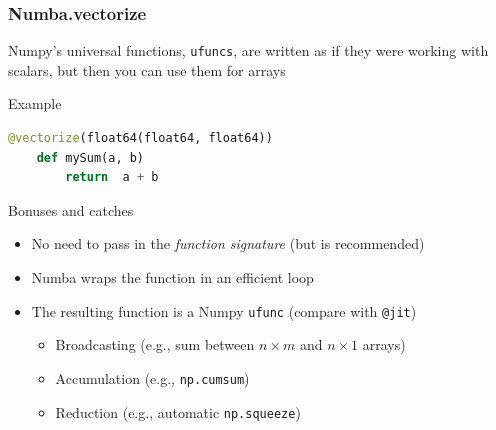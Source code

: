 \documentclass[10pt, aspectratio=1610]{beamer}
\begin{document}
\begin{frame}[fragile]
  \frametitle{Numba.vectorize}

  Numpy's universal functions, \texttt{ufuncs}, are written as if they were working with scalars, but then you can use them for arrays

  \vfill

  Example
  \begin{lstlisting}[language=python]
    @vectorize(float64(float64, float64))
    def mySum(a, b)
        return  a + b
  \end{lstlisting}

  \vfill

  Bonuses and catches
  \begin{itemize}
    \item No need to pass in the \emph{function signature} (but is recommended)
    \item Numba wraps the function in an efficient loop
    \item The resulting function is a Numpy \texttt{ufunc} (compare with \lstinline{@jit})
      \begin{itemize}
        \item Broadcasting (e.g., sum between $n \times m$ and $n \times 1$ arrays)
        \item Accumulation (e.g., \texttt{np.cumsum})
        \item Reduction (e.g., automatic \texttt{np.squeeze})
      \end{itemize}
  \end{itemize}

\end{frame}
\end{document}
